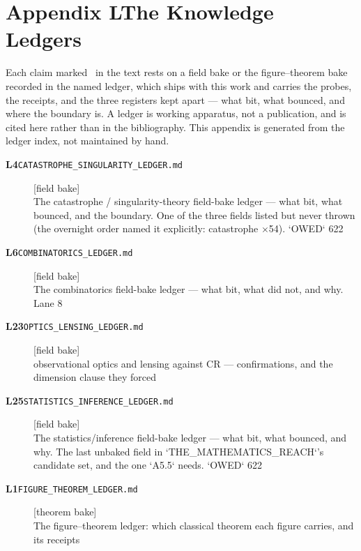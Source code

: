 \clearpage
\section*{Appendix L\quad The Knowledge Ledgers}\label{app:ledgers}
\small\noindent Each claim marked \ldgmarker\ in the text rests on a field bake or the figure--theorem bake recorded in the named ledger, which ships with this work and carries the probes, the receipts, and the three registers kept apart --- what bit, what bounced, and where the boundary is. A ledger is working apparatus, not a publication, and is cited here rather than in the bibliography. This appendix is generated from the ledger index, not maintained by hand.\par\medskip
\begingroup\renewcommand{\arraystretch}{1.25}
\begin{description}
\item[\textbf{L4}\quad\texttt{CATASTROPHE\_SINGULARITY\_LEDGER.md}]\hfill\textsf{[field bake]}\\
The catastrophe / singularity-theory field-bake ledger --- what bit, what bounced, and the boundary. One of the three fields listed but never thrown (the overnight order named it explicitly: catastrophe $\times$54). `OWED` 622
\item[\textbf{L6}\quad\texttt{COMBINATORICS\_LEDGER.md}]\hfill\textsf{[field bake]}\\
The combinatorics field-bake ledger --- what bit, what did not, and why. Lane 8
\item[\textbf{L23}\quad\texttt{OPTICS\_LENSING\_LEDGER.md}]\hfill\textsf{[field bake]}\\
observational optics and lensing against CR --- confirmations, and the dimension clause they forced
\item[\textbf{L25}\quad\texttt{STATISTICS\_INFERENCE\_LEDGER.md}]\hfill\textsf{[field bake]}\\
The statistics/inference field-bake ledger --- what bit, what bounced, and why. The last unbaked field in `THE\_MATHEMATICS\_REACH`'s candidate set, and the one `A5.5` needs. `OWED` 622
\item[\textbf{L1}\quad\texttt{FIGURE\_THEOREM\_LEDGER.md}]\hfill\textsf{[theorem bake]}\\
The figure--theorem ledger: which classical theorem each figure carries, and its receipts
\end{description}
\endgroup
